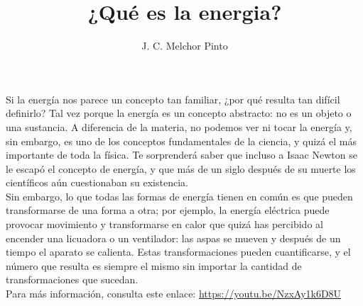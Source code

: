 \documentclass[12pt,addpoints,answers]{guia}
\title{¿Qué es la energia?}
\author{J. C. Melchor Pinto}
\begin{document}
\pagestyle{headandfoot}

\INFO
\begin{opening}
    {Si la energía nos parece un concepto tan familiar, ¿por qué resulta tan
        difícil definirlo? Tal vez porque la energía es un concepto abstracto: no
        es un objeto o una sustancia. A diferencia de la materia, no podemos
        ver ni tocar la energía y, sin embargo, es uno de los conceptos fundamentales
        de la ciencia, y quizá el más importante de toda la física. Te sorprenderá saber que incluso a Isaac Newton se le escapó
        el concepto de energía, y que más de un siglo después de su muerte los
        científicos aún cuestionaban su existencia.\\[1em]
        Sin embargo, lo que todas las formas de energía tienen en común es
        que pueden transformarse de una forma a otra; por ejemplo, la energía
        eléctrica puede provocar movimiento y transformarse en calor que quizá
        has percibido al encender una licuadora o un ventilador: las aspas se mueven y después de un tiempo el aparato se calienta. Estas transformaciones
        pueden cuantificarse, y el número que resulta es siempre el mismo sin importar la cantidad de transformaciones que sucedan.
        \\[1em]
        Para más información, consulta este enlace: \href{https://youtu.be/NzxAy1k6D8U}{https://youtu.be/NzxAy1k6D8U}
    }
\end{opening}
\begin{questions}
    
    \newpage
    
\end{questions}

\end{document}
